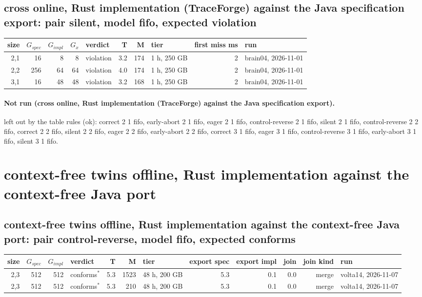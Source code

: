 \documentclass[10pt]{article}
\begin{document}
\subsection*{cross online, Rust implementation (TraceForge) against the Java specification export: pair \textsf{silent}, model fifo, expected violation}
\begin{longtable}{@{}rrrrlrrlrl@{}}
\toprule
size & $G_{\mathit{spec}}$ & $G_{\mathit{impl}}$ & $G_x$ & verdict & T & M & tier & first miss ms & run \\
\midrule
\endhead
\color{red} 2,1 & 16 & 8 & 8 & violation & 3.2 & 174 & 1 h, 250 GB & 2 & brain04, 2026-11-01 \\
\color{red} 2,2 & 256 & 64 & 64 & violation & 4.0 & 174 & 1 h, 250 GB & 2 & brain04, 2026-11-01 \\
\color{red} 3,1 & 16 & 48 & 48 & violation & 3.2 & 168 & 1 h, 250 GB & 2 & brain04, 2026-11-01 \\
\bottomrule
\end{longtable}
\paragraph{Not run (cross online, Rust implementation (TraceForge) against the Java specification export).}
left out by the table rules (ok): correct 2 1 fifo, early-abort 2 1 fifo, eager 2 1 fifo, control-reverse 2 1 fifo, silent 2 1 fifo, control-reverse 2 2 fifo, correct 2 2 fifo, silent 2 2 fifo, eager 2 2 fifo, early-abort 2 2 fifo, correct 3 1 fifo, eager 3 1 fifo, control-reverse 3 1 fifo, early-abort 3 1 fifo, silent 3 1 fifo.\par
\section*{context-free twins offline, Rust implementation against the context-free Java port}
\subsection*{context-free twins offline, Rust implementation against the context-free Java port: pair \textsf{control-reverse}, model fifo, expected conforms}
\begin{longtable}{@{}rrrlrrlrrrrl@{}}
\toprule
size & $G_{\mathit{spec}}$ & $G_{\mathit{impl}}$ & verdict & T & M & tier & export spec & export impl & join & join kind & run \\
\midrule
\endhead
\color{red} 2,3 & 512 & 512 & conforms$^{\ast}$ & 5.3 & 1523 & 48 h, 200 GB & 5.3 & 0.1 & 0.0 & merge & volta14, 2026-11-07 \\
\color{red} 2,3 & 512 & 512 & conforms$^{\ast}$ & 5.3 & 210 & 48 h, 200 GB & 5.3 & 0.1 & 0.0 & merge & volta14, 2026-11-07 \\
\bottomrule
\end{longtable}
\end{document}
